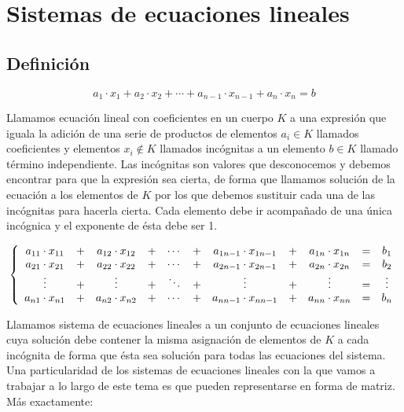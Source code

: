 \section{Sistemas de ecuaciones lineales}\label{sistemas-de-ecuaciones-lineales}

\subsection{Definición}\label{definicion}

\[a_1 \cdot x_1 + a_2 \cdot x_2 + \cdots + a_{n-1} \cdot x_{n-1} + a_n \cdot x_n = b\]

Llamamos ecuación lineal con coeficientes en un cuerpo $K$ a una expresión que iguala la adición de una serie de productos de elementos $a_i \in K$ llamados coeficientes y elementos $x_i \notin K$ llamados incógnitas a un elemento $b \in K$ llamado término independiente.
Las incógnitas son valores que desconocemos y debemos encontrar para que la expresión sea cierta, de forma que llamamos solución de la ecuación a los elementos de $K$ por los que debemos sustituir cada una de las incógnitas para hacerla cierta.
Cada elemento debe ir acompañado de una única incógnica y el exponente de ésta debe ser 1.

\[
	\left\{
	\begin{array}{cc cc cc cc ccc}
		a_{11} \cdot x_{11} & + & a_{12} \cdot x_{12} & + & \cdots & + & a_{1{n-1}} \cdot x_{1{n-1}} & + & a_{1n} \cdot x_{1n} & = & b_{1}  \\
		a_{21} \cdot x_{21} & + & a_{22} \cdot x_{22} & + & \cdots & + & a_{2{n-1}} \cdot x_{2{n-1}} & + & a_{2n} \cdot x_{2n} & = & b_{2}  \\
		\vdots              & + & \vdots              & + & \ddots & + & \vdots                      & + & \vdots              & = & \vdots \\
		a_{n1} \cdot x_{n1} & + & a_{n2} \cdot x_{n2} & + & \cdots & + & a_{n{n-1}} \cdot x_{n{n-1}} & + & a_{nn} \cdot x_{nn} & = & b_{n}
	\end{array}
	\right.
\]

Llamamos sistema de ecuaciones lineales a un conjunto de ecuaciones lineales cuya solución debe contener la misma asignación de elementos de $K$ a cada incógnita de forma que ésta sea solución para todas las ecuaciones del sistema.
Una particularidad de los sistemas de ecuaciones lineales con la que vamos a trabajar a lo largo de este tema es que pueden representarse en forma de matriz.
Más exactamente:

